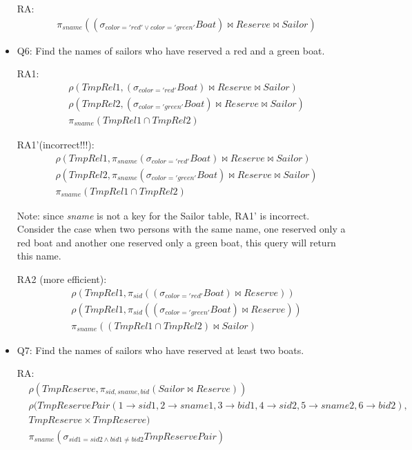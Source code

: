 \documentclass[10pt]{article}
\begin{document}
\begin{itemize}
  RA:
  \begin{align*}
    &\pi_{sname}((\sigma_{color='red' \lor color='green'}Boat) \bowtie
    Reserve \bowtie Sailor)
  \end{align*}

\item Q6: Find the names of sailors who have reserved a red and a
  green boat.

  RA1:
  \begin{align*}
    &\rho(TmpRel1, (\sigma_{color='red'}Boat) \bowtie Reserve
    \bowtie Sailor)\\
    &\rho(TmpRel2, (\sigma_{color='green'}Boat) \bowtie Reserve
    \bowtie Sailor)\\
    &\pi_{sname}(TmpRel1 \cap TmpRel2)
  \end{align*}

  RA1'(incorrect!!!):
  \begin{align*}
    &\rho(TmpRel1, \pi_{sname}(\sigma_{color='red'}Boat) \bowtie Reserve
    \bowtie Sailor)\\
    &\rho(TmpRel2, \pi_{sname}(\sigma_{color='green'}Boat) \bowtie Reserve
    \bowtie Sailor)\\
    &\pi_{sname}(TmpRel1 \cap TmpRel2)
  \end{align*}

  Note: since \emph{sname} is not a key for the Sailor table, RA1' is
  incorrect. Consider the case when two persons with the same name,
  one reserved only a red boat and another one reserved only a green
  boat, this query will return this name.

  RA2 (more efficient):
  \begin{align*}
    &\rho(TmpRel1, \pi_{sid}((\sigma_{color='red'}Boat) \bowtie
    Reserve))\\
    &\rho(TmpRel1, \pi_{sid}((\sigma_{color='green'}Boat) \bowtie
    Reserve))\\
    &\pi_{sname}((TmpRel1 \cap TmpRel2) \bowtie Sailor)
  \end{align*}

\item Q7: Find the names of sailors who have reserved at least two
  boats.

  RA:
  \begin{align*}
    &\rho(TmpReserve, \pi_{sid, sname, bid}(Sailor \bowtie Reserve))\\
    &\rho(TmpReservePair(1 \rightarrow sid1, 2 \rightarrow sname1, 3
    \rightarrow bid1, 4 \rightarrow sid2, 5 \rightarrow sname2, 6
    \rightarrow bid2),\\
    &TmpReserve \times TmpReserve)\\
    &\pi_{sname}(\sigma_{sid1=sid2 \land bid1 \neq bid2}TmpReservePair)
  \end{align*}


\end{itemize}
\end{document}
